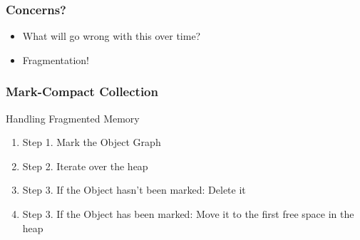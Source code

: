 \documentclass{beamer}
\begin{document}
\begin{frame}
  \frametitle{Concerns?}
  \begin{itemize}
    \item What will go wrong with this over time?
    \pause{}
    \item Fragmentation!
  \end{itemize}
\end{frame}

\begin{frame}
  \frametitle{Mark-Compact Collection}
  \begin{heading}
    Handling Fragmented Memory
  \end{heading}

  \begin{enumerate}
    \item Step 1. Mark the Object Graph
    \item Step 2. Iterate over the heap
    \item Step 3. If the Object hasn't been marked: Delete it
    \item Step 3. If the Object has    been marked: Move it to the first free space in the heap
  \end{enumerate}
\end{frame}
\end{document}

